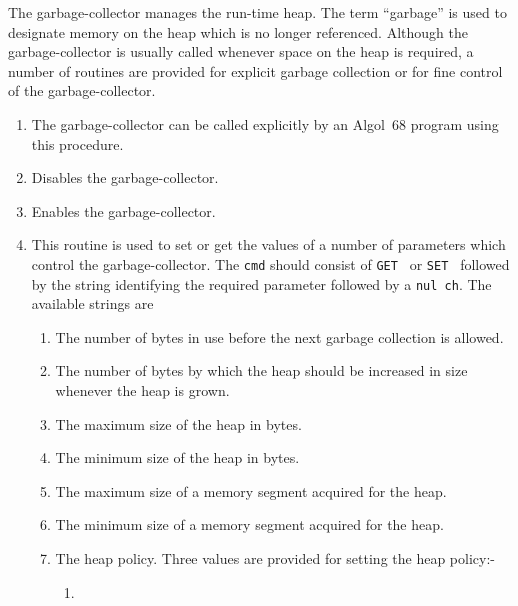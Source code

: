The garbage-collector manages the run-time heap. The term ``garbage''
is used to designate memory on the heap which is no longer
referenced. Although the garbage-collector is usually called whenever
space on the heap is required, a number of routines are provided for
explicit garbage collection or for fine control of the
garbage-collector.
\begin{enumerate}
\item {}\newline
The garbage-collector can be called explicitly by an Algol~68 program
using this procedure.
\item {}\newline
Disables the garbage-collector.
\item {}\newline
Enables the garbage-collector.
\item {}\newline
This routine is used to set or get the values of a number of
parameters which control the garbage-collector. The \verb|cmd| should
consist of \verb*|GET | or \verb*|SET | followed by the string
identifying the required parameter followed by a \verb|nul ch|.
The available strings are
\begin{enumerate}
\item {} The number of bytes in use before
the next garbage collection is allowed.
\item {} The number of bytes by which the heap
should be increased in size whenever the heap is grown.
\item {} The maximum size of the heap in bytes.
\item {} The minimum size of the heap in bytes.
\item {} The maximum size of a memory segment
acquired for the heap.
\item {} The minimum size of a memory segment
acquired for the heap.
\item {} The heap policy. Three values are provided for
setting the heap policy:-
\begin{enumerate}
\item {}\newline

\end{enumerate}
\end{enumerate}
\end{enumerate}

